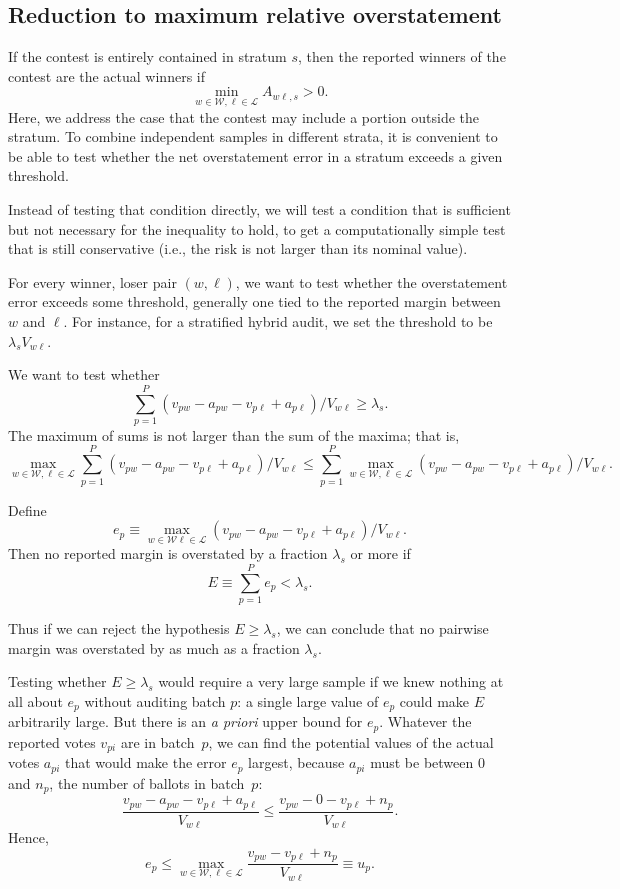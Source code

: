 \documentclass[runningheads]{llncs}
\begin{document}
\subsection{Reduction to maximum relative overstatement}
If the contest is entirely contained in stratum $s$, then
the reported winners of the contest are the actual winners if
$$ 
   \min_{w \in \mathcal{W}, \ell \in \mathcal{L}} A_{w\ell,s} > 0.
$$
Here, we address the case that the contest may include a portion outside the stratum.
To combine independent samples in different strata, it is convenient
to be able to test whether the net overstatement error in a stratum exceeds a given threshold.

Instead of testing that condition directly, we will test a condition that is sufficient 
but not necessary for the inequality to hold, to get a computationally simple test that
is still conservative (i.e., the risk is not larger than its nominal value).

For every winner, loser pair $(w, \ell)$, we want to test
whether the overstatement error exceeds some threshold, generally
one tied to the reported margin between $w$ and $\ell$.
For instance, for a stratified hybrid audit, we set the threshold to be
$\lambda_s V_{w\ell}$.

We want to test whether
$$
   \sum_{p=1}^P (v_{pw}-a_{pw} - v_{p\ell} + a_{p\ell})/V_{w\ell} \ge \lambda_s.
$$
The maximum of sums is not larger than the sum of the maxima; that is,
$$
\max_{w \in \mathcal{W},  \ell \in \mathcal{L}}
   \sum_{p=1}^P (v_{pw}-a_{pw} - v_{p\ell} + a_{p\ell})/V_{w\ell}
   \le
  \sum_{p=1}^P  \max_{w \in \mathcal{W},  \ell \in \mathcal{L}} 
  (v_{pw}-a_{pw} - v_{p\ell} + a_{p\ell})/V_{w\ell}.
$$

Define 
$$
  e_p \equiv \max_{w \in \mathcal{W} \ell \in \mathcal{L}} 
     (v_{pw}-a_{pw} - v_{p\ell} + a_{p\ell})/V_{w\ell}.
$$
Then no reported margin is overstated by a fraction $\lambda_s$ or more
if 
$$ 
  E \equiv \sum_{p=1}^P e_p < \lambda_s.
$$

Thus if we can reject the hypothesis $E \ge \lambda_s$, we can conclude that
no pairwise margin was overstated by as much as a fraction $\lambda_s$.

Testing whether $E \ge \lambda_s$ would require a very large sample if we knew nothing at
all about $e_p$ without auditing batch $p$: a single large value of $e_p$ could make
$E$ arbitrarily large.
But there is an \emph{a priori} upper bound for $e_p$.
Whatever the reported votes $v_{pi}$ are in batch~$p$, we can find the
potential values of the actual votes $a_{pi}$ that would make the
error $e_p$ largest, because $a_{pi}$ must be between 0 and $n_p$,
the number of ballots in batch~$p$:
$$
    \frac{v_{pw}-a_{pw} - v_{p\ell} + a_{p\ell}}{V_{w\ell}} \le 
    \frac{v_{pw}- 0 - v_{p\ell} + n_p}{V_{w\ell}}.
$$
Hence,
\begin{equation} \label{eq:uDef}
    e_p \le \max_{w \in \mathcal{W}, \ell \in \mathcal{L}} 
    \frac{v_{pw} - v_{p\ell} + n_p}{V_{w\ell}} \equiv u_p.
\end{equation}
\end{document}
